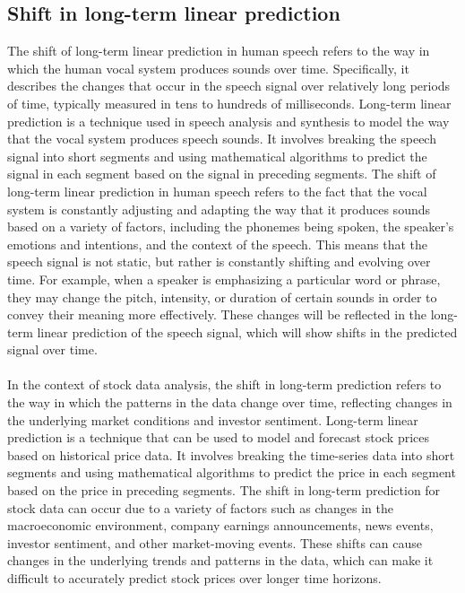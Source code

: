     \subsection{Shift in long-term linear prediction} \label{subsec:shiftlp}
    The shift of long-term linear prediction in human speech refers to the way in which the human vocal system produces sounds over time.
    Specifically, it describes the changes that occur in the speech signal over relatively long periods of time, typically measured in tens to
    hundreds of milliseconds. Long-term linear prediction is a technique used in speech analysis and synthesis to model the way that the vocal system
    produces speech sounds. It involves breaking the speech signal into short segments and using mathematical algorithms to predict the signal in each
    segment based on the signal in preceding segments. The shift of long-term linear prediction in human speech refers to the fact that the vocal
    system is constantly adjusting and adapting the way that it produces sounds based on a variety of factors, including the phonemes being spoken,
    the speaker's emotions and intentions, and the context of the speech. This means that the speech signal is not static, but rather is constantly
    shifting and evolving over time. For example, when a speaker is emphasizing a particular word or phrase, they may change the pitch, intensity,
    or duration of certain sounds in order to convey their meaning more effectively. These changes will be reflected in the long-term linear
    prediction of the speech signal, which will show shifts in the predicted signal over time.\\
    \\
    In the context of stock data analysis, the shift in long-term prediction refers to the way in which the patterns in the data change over time,
    reflecting changes in the underlying market conditions and investor sentiment. Long-term linear prediction is a technique that can be used to
    model and forecast stock prices based on historical price data. It involves breaking the time-series data into short segments and using
    mathematical algorithms to predict the price in each segment based on the price in preceding segments.
    The shift in long-term prediction for stock data can occur due to a variety of factors such as changes in the macroeconomic environment,
    company earnings announcements, news events, investor sentiment, and other market-moving events. These shifts can cause changes in the underlying
    trends and patterns in the data, which can make it difficult to accurately predict stock prices over longer time horizons.
